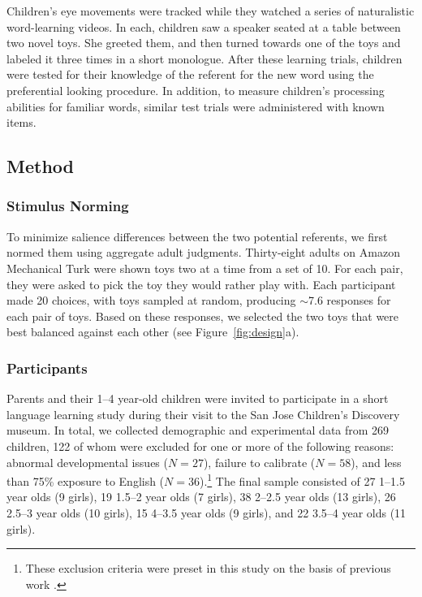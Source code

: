 \documentclass[man,floatsintext]{apa6}
\begin{document}
Children's eye movements were tracked while they watched a series of naturalistic word-learning videos. In each, children saw a speaker seated at a table between two novel toys. She greeted them, and then turned towards one of the toys and labeled it three times in a short monologue.
After these learning trials, children were tested for their knowledge of the referent for the new word using the preferential looking procedure. In addition, to measure children's processing abilities for familiar words, similar test trials were administered with known items.

\subsection{Method}

\subsubsection{Stimulus Norming}
To minimize salience differences between the two potential referents, we first normed them using aggregate adult judgments. Thirty-eight adults on Amazon Mechanical Turk were shown toys two at a time from a set of 10. For each pair, they were asked to pick the toy they would rather play with. Each participant made 20 choices, with toys sampled at random, producing $\sim$7.6 responses for each pair of toys. Based on these responses, we selected the two toys that were best balanced against each other (see Figure~\ref{fig:design}a).

\subsubsection{Participants}

Parents and their 1--4 year-old children were invited to participate in a short language learning study during their visit to the San Jose Children's Discovery museum. In total, we collected demographic and experimental data from 269 children, 122 of whom were excluded for one or more of the following reasons: abnormal developmental issues ($N= 27$), failure to calibrate ($N=58$), and less than 75\% exposure to English ($N=36$).\footnote{These exclusion criteria were preset in this study on the basis of previous work \cite{Yurovsky2013c}.} The final sample consisted of 27 1--1.5 year olds (9 girls), 19 1.5--2 year olds (7 girls), 38 2--2.5 year olds (13 girls), 26 2.5--3 year olds (10 girls), 15 4--3.5 year olds (9 girls), and 22 3.5--4 year olds (11 girls).
\end{document}
